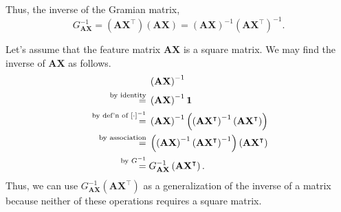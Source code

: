 \documentclass{article}
\begin{document}
Thus, the inverse of the Gramian matrix,
\begin{equation}
    G_{\mathbf{AX}}^{-1} = \left(\mathbf{AX}^\intercal\right) \left(\mathbf{AX}\right) = \left(\mathbf{AX}\right)^{-1} \left(\mathbf{AX}^\intercal\right)^{-1}.
\end{equation}

Let's assume that the feature matrix $\mathbf{AX}$ is a square matrix.
We may find the inverse of $\mathbf{AX}$ as follows.
%
\begin{equation}
    \begin{aligned}
            & \left(\mathbf{AX}\right)^{-1} \\*
        {}\overset{\text{by identity}}{\hspace\fill=}{}
            & \left(\mathbf{AX}\right)^{-1} \mathbf{1} \\*
        {}\overset{\text{by def'n of $\left[\mathbf{\cdot}\right]^{-1}$}}{\hspace\fill=}{}
            & \left(\mathbf{AX}\right)^{-1} \left(\left(\mathbf{AX}^\intercal\right)^{-1} \left(\mathbf{AX}^\intercal\right)\right) \\*
        {}\overset{\text{by association}}{\hspace\fill=}{}
            & \left(\left(\mathbf{AX}\right)^{-1} \left(\mathbf{AX}^\intercal\right)^{-1}\right)
                \left(\mathbf{AX}^\intercal\right) \\*
        {}\overset{\text{by $G^{-1}$}}{\hspace\fill=}{}
            & G_{\mathbf{AX}}^{-1}
                \left(\mathbf{AX}^\intercal\right). \\*
    \end{aligned}
\end{equation}
Thus, we can use $G_{\mathbf{AX}}^{-1} \left(\mathbf{AX}^\intercal\right)$ as a generalization of the inverse of a matrix because neither of these operations requires a square matrix.

\end{document}
